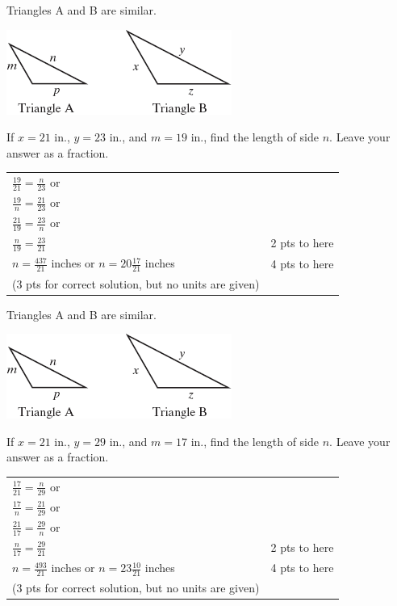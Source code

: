 {
	Triangles A and B are similar.\begin{center}\includegraphics{fig100-09.png}\end{center} If $x=21$ in., $y=23$ in., and $m=19$ in., find the length of side $n$. Leave your answer as a fraction.
}
{
	\begin{tabular}{l r}
	$\frac{19}{21}=\frac{n}{23}$ or &  \\
	$\frac{19}{n}=\frac{21}{23}$ or& \\
	$\frac{21}{19}=\frac{23}{n}$ or &\\
	$\frac{n}{19}=\frac{23}{21}$ & 2 pts to here\\
	$n=\frac{437}{21}$ inches or $n= 20 \frac{17}{21}$ inches & 4 pts to here \\
	(3 pts for correct solution, but no units are given)
	\end{tabular}
}

{
	Triangles A and B are similar.\begin{center}\includegraphics{fig100-09.png}\end{center} If $x=21$ in., $y=29$ in., and $m=17$ in., find the length of side $n$. Leave your answer as a fraction.
}
{
	\begin{tabular}{l r}
	$\frac{17}{21}=\frac{n}{29}$ or &  \\
	$\frac{17}{n}=\frac{21}{29}$ or& \\
	$\frac{21}{17}=\frac{29}{n}$ or &\\
	$\frac{n}{17}=\frac{29}{21}$ & 2 pts to here\\
	$n=\frac{493}{21}$ inches or $n= 23 \frac{10}{21}$ inches & 4 pts to here \\
	(3 pts for correct solution, but no units are given)
	\end{tabular}
}

